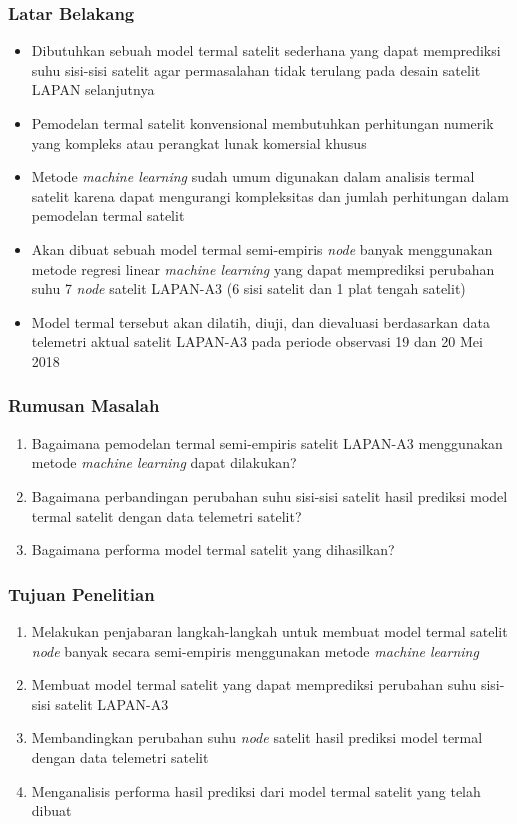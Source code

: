 \documentclass[8pt]{beamer}
\begin{document}
\begin{frame}
  \frametitle{Latar Belakang}
    \begin{itemize}
      \item Dibutuhkan sebuah model termal satelit sederhana yang dapat memprediksi suhu sisi-sisi satelit agar permasalahan tidak terulang pada desain satelit LAPAN selanjutnya
      \item Pemodelan termal satelit konvensional membutuhkan perhitungan numerik yang kompleks \cite{das} atau perangkat lunak komersial khusus \cite{boudjemai2015}
      \item Metode \textit{machine learning} sudah umum digunakan dalam analisis termal satelit karena dapat mengurangi kompleksitas dan jumlah perhitungan dalam pemodelan termal satelit \cite{junior2017}\cite{escobar2016}\cite{xiong2020}
      \item Akan dibuat sebuah model termal semi-empiris \textit{node} banyak menggunakan metode regresi linear \textit{machine learning} yang dapat memprediksi perubahan suhu 7 \textit{node} satelit LAPAN-A3 (6 sisi satelit dan 1 plat tengah satelit)
      \item Model termal tersebut akan dilatih, diuji, dan dievaluasi berdasarkan data telemetri aktual satelit LAPAN-A3 pada periode observasi 19 dan 20 Mei 2018
    \end{itemize}
\end{frame}


\begin{frame}
  \frametitle{Rumusan Masalah}
  \begin{enumerate}
    \item Bagaimana pemodelan termal semi-empiris satelit LAPAN-A3 menggunakan metode \textit{machine learning} dapat dilakukan?
    \item Bagaimana perbandingan perubahan suhu sisi-sisi satelit hasil prediksi model termal satelit dengan data telemetri satelit?
    \item Bagaimana performa model termal satelit yang dihasilkan?
  \end{enumerate}
\end{frame}

\begin{frame}
  \frametitle{Tujuan Penelitian}
  \begin{enumerate}
    \item Melakukan penjabaran langkah-langkah untuk membuat model termal satelit \textit{node} banyak secara semi-empiris menggunakan metode \textit{machine learning}
    \item Membuat model termal satelit yang dapat memprediksi perubahan suhu sisi-sisi satelit LAPAN-A3
    \item Membandingkan perubahan suhu \textit{node} satelit hasil prediksi model termal dengan data telemetri satelit
    \item Menganalisis performa hasil prediksi dari model termal satelit yang telah dibuat
\end{enumerate}

\end{frame}
\end{document}
